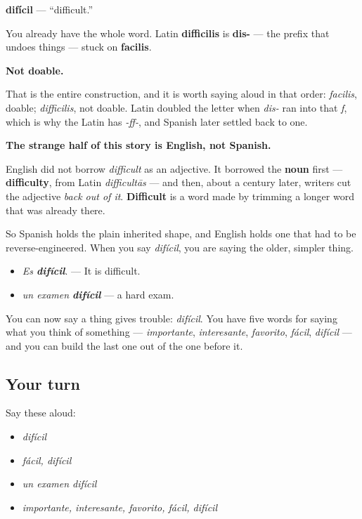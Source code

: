 \begin{cousinweb}
\textbf{difícil} — \textquotedblleft{}difficult.\textquotedblright{}

You already have the whole word. Latin \textbf{difficilis} is \textbf{dis-} — the prefix that undoes things — stuck on \textbf{facilis}.

\textbf{Not doable.}

That is the entire construction, and it is worth saying aloud in that order: \emph{facilis}, doable; \emph{difficilis}, not doable. Latin doubled the letter when \emph{dis-} ran into that \emph{f}, which is why the Latin has \emph{-ff-}, and Spanish later settled back to one.

\textbf{The strange half of this story is English, not Spanish.}

English did not borrow \emph{difficult} as an adjective. It borrowed the \textbf{noun} first — \textbf{difficulty}, from Latin \emph{difficultās} — and then, about a century later, writers cut the adjective \emph{back out of it}. \textbf{Difficult} is a word made by trimming a longer word that was already there.

So Spanish holds the plain inherited shape, and English holds one that had to be reverse-engineered. When you say \emph{difícil}, you are saying the older, simpler thing.

\begin{itemize}
\raggedright
  \item \emph{Es \textbf{difícil}}. — It is difficult.
  \item \emph{un examen \textbf{difícil}} — a hard exam.
\end{itemize}
\end{cousinweb}

\begin{grammarlens}[title={What you've built}]
You can now say a thing gives trouble: \emph{difícil}. You have five words for saying what you think of something — \emph{importante}, \emph{interesante}, \emph{favorito}, \emph{fácil}, \emph{difícil} — and you can build the last one out of the one before it.
\end{grammarlens}

\subsection*{Your turn}
Say these aloud:

\begin{itemize}
\raggedright
  \item \emph{difícil}
  \item \emph{fácil, difícil}
  \item \emph{un examen difícil}
  \item \emph{importante, interesante, favorito, fácil, difícil}
\end{itemize}


